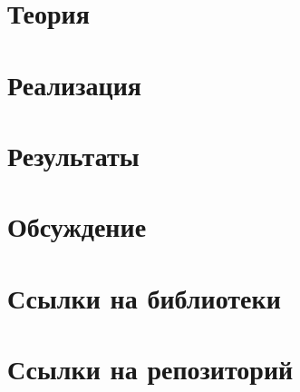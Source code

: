 \documentclass[14pt,a4paper,article]{ncc}
\begin{document}
\section{Теория}
\label{sec:theory}






\newpage

\section{Реализация}
\label{sec:impl}
\newpage

\section{Результаты}
\label{sec:result}





\newpage

\section{Обсуждение}
\label{sec:discuss}





\newpage

\section{Ссылки на библиотеки}
\label{sec:liter}

\newpage

\section{Ссылки на репозиторий}
\label{sec:rep}

\end{document}
